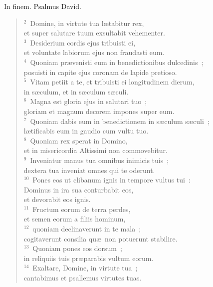 \lettrine[lines=3,image=true,loversize=0.05,lraise=-0.03]{I}{}n finem. Psalmus David.
\begin{flushleft}\begin{verse}\vspace{6pt}${}^{2}$~Domine, in virtute tua l\ae tabitur rex,\\ et super salutare tuum exsultabit vehementer.\\
${}^{3}$~Desiderium cordis ejus tribuisti ei,\\ et voluntate labiorum ejus non fraudasti eum.\\
${}^{4}$~Quoniam pr\ae venisti eum in benedictionibus dulcedinis~;\\ posuisti in capite ejus coronam de lapide pretioso.\\
${}^{5}$~Vitam petiit a te, et tribuisti ei longitudinem dierum,\\ in s\ae culum, et in s\ae culum s\ae culi.\\
${}^{6}$~Magna est gloria ejus in salutari tuo~;\\ gloriam et magnum decorem impones super eum.\\
${}^{7}$~Quoniam dabis eum in benedictionem in s\ae culum s\ae culi~;\\ l\ae tificabis eum in gaudio cum vultu tuo.\\
${}^{8}$~Quoniam rex sperat in Domino,\\ et in misericordia Altissimi non commovebitur.\\
${}^{9}$~Inveniatur manus tua omnibus inimicis tuis~;\\ dextera tua inveniat omnes qui te oderunt.\\
${}^{10}$~Pones eos ut clibanum ignis in tempore vultus tui~:\\ Dominus in ira sua conturbabit eos,\\ et devorabit eos ignis.\\
${}^{11}$~Fructum eorum de terra perdes,\\ et semen eorum a filiis hominum,\\
${}^{12}$~quoniam declinaverunt in te mala~;\\ cogitaverunt consilia qu\ae\ non potuerunt stabilire.\\
${}^{13}$~Quoniam pones eos dorsum~;\\ in reliquiis tuis pr\ae parabis vultum eorum.\\
${}^{14}$~Exaltare, Domine, in virtute tua~;\\ cantabimus et psallemus virtutes tuas.\end{verse}\end{flushleft}



